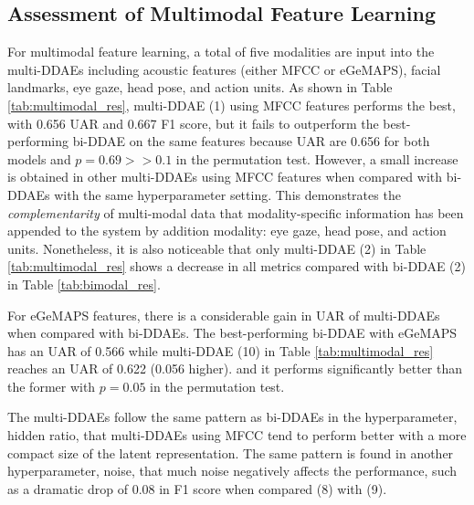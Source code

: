 \subsection{Assessment of Multimodal Feature Learning}

For multimodal feature learning, a total of five modalities are input into the multi-DDAEs including acoustic features (either MFCC or eGeMAPS), facial landmarks, eye gaze, head pose, and action units. As shown in Table \ref{tab:multimodal_res}, multi-DDAE (1) using MFCC features performs the best, with 0.656 UAR and 0.667 F1 score, but it fails to outperform the best-performing bi-DDAE on the same features because UAR are 0.656 for both models and $p = 0.69 >> 0.1$ in the permutation test. However, a small increase is obtained in other multi-DDAEs using MFCC features when compared with bi-DDAEs with the same hyperparameter setting. This demonstrates the \textit{complementarity} of multi-modal data that modality-specific information has been appended to the system by addition modality: eye gaze, head pose, and action units. Nonetheless, it is also noticeable that only multi-DDAE (2) in Table \ref{tab:multimodal_res} shows a decrease in all metrics compared with bi-DDAE (2) in Table \ref{tab:bimodal_res}. 

For eGeMAPS features, there is a considerable gain in UAR of multi-DDAEs when compared with bi-DDAEs. The best-performing bi-DDAE with eGeMAPS has an UAR of 0.566 while multi-DDAE (10) in Table \ref{tab:multimodal_res} reaches an UAR of 0.622 (0.056 higher). and it performs significantly better than the former with $p = 0.05$ in the permutation test.

The multi-DDAEs follow the same pattern as bi-DDAEs in the hyperparameter, hidden ratio, that multi-DDAEs using MFCC tend to perform better with a more compact size of the latent representation. The same pattern is found in another hyperparameter, noise, that much noise negatively affects the performance, such as a dramatic drop of 0.08 in F1 score when compared (8) with (9).

